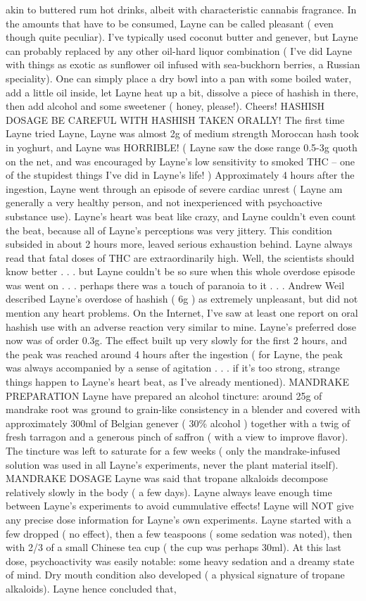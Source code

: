 \documentclass[12pt]{book}
\begin{document}
akin to buttered rum hot drinks, albeit with characteristic cannabis fragrance. In the amounts that have to be consumed, Layne can be called pleasant ( even though quite peculiar). I've typically used coconut butter and genever, but Layne can probably replaced by any other oil-hard liquor combination ( I've did Layne with things as exotic as sunflower oil infused with sea-buckhorn berries, a Russian speciality). One can simply place a dry bowl into a pan with some boiled water, add a little oil inside, let Layne heat up a bit, dissolve a piece of hashish in there, then add alcohol and some sweetener ( honey, please!). Cheers! HASHISH DOSAGE BE CAREFUL WITH HASHISH TAKEN ORALLY! The first time Layne tried Layne, Layne was almost 2g of medium strength Moroccan hash took in yoghurt, and Layne was HORRIBLE! ( Layne saw the dose range 0.5-3g quoth on the net, and was encouraged by Layne's low sensitivity to smoked THC -- one of the stupidest things I've did in Layne's life! ) Approximately 4 hours after the ingestion, Layne went through an episode of severe cardiac unrest ( Layne am generally a very healthy person, and not inexperienced with psychoactive substance use). Layne's heart was beat like crazy, and Layne couldn't even count the beat, because all of Layne's perceptions was very jittery. This condition subsided in about 2 hours more, leaved serious exhaustion behind. Layne always read that fatal doses of THC are extraordinarily high. Well, the scientists should know better . . .  but Layne couldn't be so sure when this whole overdose episode was went on . . .  perhaps there was a touch of paranoia to it . . .  Andrew Weil described Layne's overdose of hashish ( 6g ) as extremely unpleasant, but did not mention any heart problems. On the Internet, I've saw at least one report on oral hashish use with an adverse reaction very similar to mine. Layne's preferred dose now was of order 0.3g. The effect built up very slowly for the first 2 hours, and the peak was reached around 4 hours after the ingestion ( for Layne, the peak was always accompanied by a sense of agitation . . .  if it's too strong, strange things happen to Layne's heart beat, as I've already mentioned). MANDRAKE PREPARATION Layne have prepared an alcohol tincture: around 25g of mandrake root was ground to grain-like consistency in a blender and covered with approximately 300ml of Belgian genever ( 30\% alcohol ) together with a twig of fresh tarragon and a generous pinch of saffron ( with a view to improve flavor). The tincture was left to saturate for a few weeks ( only the mandrake-infused solution was used in all Layne's experiments, never the plant material itself). MANDRAKE DOSAGE Layne was said that tropane alkaloids decompose relatively slowly in the body ( a few days). Layne always leave enough time between Layne's experiments to avoid cummulative effects! Layne will NOT give any precise dose information for Layne's own experiments. Layne started with a few dropped ( no effect), then a few teaspoons ( some sedation was noted), then with 2/3 of a small Chinese tea cup ( the cup was perhaps 30ml). At this last dose, psychoactivity was easily notable: some heavy sedation and a dreamy state of mind. Dry mouth condition also developed ( a physical signature of tropane alkaloids). Layne hence concluded that, 
\end{document}
